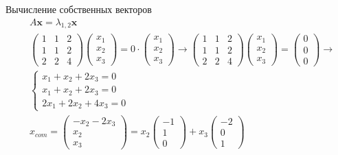 \begin{frame}{Вычисление собственных векторов}
    $$
    \begin{aligned}
    & A \mathbf{x}=\lambda_{1,2} \mathbf{x} \\
    &\left(\begin{array}{lll}
    1 & 1 & 2 \\
    1 & 1 & 2 \\
    2 & 2 & 4
    \end{array}\right)\left(\begin{array}{l}
    x_{1} \\
    x_{2} \\
    x_{3}
    \end{array}\right)=0 \cdot\left(\begin{array}{l}
    x_{1} \\
    x_{2} \\
    x_{3}
    \end{array}\right) \rightarrow\left(\begin{array}{lll}
    1 & 1 & 2 \\
    1 & 1 & 2 \\
    2 & 2 & 4
    \end{array}\right)\left(\begin{array}{l}
    x_{1} \\
    x_{2} \\
    x_{3}
    \end{array}\right)=\left(\begin{array}{l}
    0 \\
    0 \\
    0
    \end{array}\right) \rightarrow \\
    &\left\{\begin{array}{l}
    x_{1}+x_{2}+2 x_{3}=0 \\
    x_{1}+x_{2}+2 x_{3}=0 \\
    2 x_{1}+2 x_{2}+4 x_{3}=0
    \end{array}\right. \\
    &x_{com}=\left(\begin{array}{c}-x_{2}-2 x_{3} \\ x_{2} \\ x_{3}\end{array}\right)=x_{2}\left(\begin{array}{r}-1 \\ 1 \\ 0\end{array}\right)+x_{3}\left(\begin{array}{r}-2 \\ 0 \\ 1\end{array}\right)
    \end{aligned}
    $$
\end{frame}
